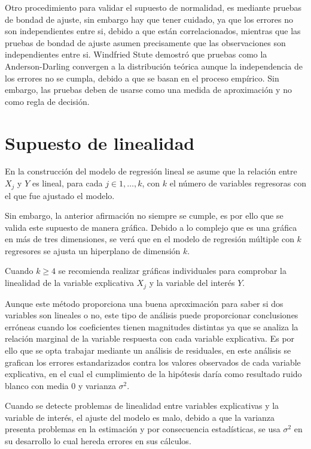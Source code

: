 \documentclass[
  a4paper,
  oneside,
  openany]{book}
\begin{document}
Otro procedimiento para validar el supuesto de normalidad, es mediante pruebas de bondad de ajuste, sin embargo hay que tener cuidado, ya que los errores no son independientes entre si, debido a que están correlacionados, mientras que las pruebas de bondad de ajuste asumen precisamente que las observaciones son independientes entre si. Windfried Stute demostró que pruebas como la Anderson-Darling convergen a la distribución teórica aunque la independencia de los errores no se cumpla, debido a que se basan en el proceso empírico. Sin embargo, las pruebas deben de usarse como una medida de aproximación y no como regla de decisión.

\hypertarget{supuesto-de-linealidad}{%
\section{Supuesto de linealidad}\label{supuesto-de-linealidad}}

En la construcción del modelo de regresión lineal se asume que la relación entre \(X_{j}\) y \(Y\) es lineal, para cada \(j \in 1,\ldots,k\), con \(k\) el número de variables regresoras con el que fue ajustado el modelo.

Sin embargo, la anterior afirmación no siempre se cumple, es por ello que se valida este supuesto de manera gráfica. Debido a lo complejo que es una gráfica en más de tres dimensiones, se verá que en el modelo de regresión múltiple con \(k\) regresores se ajusta un hiperplano de dimensión \(k\).

Cuando \(k\geq 4\) se recomienda realizar gráficas individuales para comprobar la linealidad de la variable explicativa \(X_{j}\) y la variable del interés \(Y\).

Aunque este método proporciona una buena aproximación para saber si dos variables son lineales o no, este tipo de análisis puede proporcionar conclusiones erróneas cuando los coeficientes tienen magnitudes distintas ya que se analiza la relación marginal de la variable respuesta con cada variable explicativa. Es por ello que se opta trabajar mediante un análisis de residuales, en este análisis se grafican los errores estandarizados contra los valores observados de cada variable explicativa, en el cual el cumplimiento de la hipótesis daría como resultado ruido blanco con media 0 y varianza \(\sigma^2.\)

Cuando se detecte problemas de linealidad entre variables explicativas y la variable de interés, el ajuste del modelo es malo, debido a que la varianza presenta problemas en la estimación y por consecuencia estadísticas, se usa \(\sigma^2\) en su desarrollo lo cual hereda errores en sus cálculos.
\end{document}
